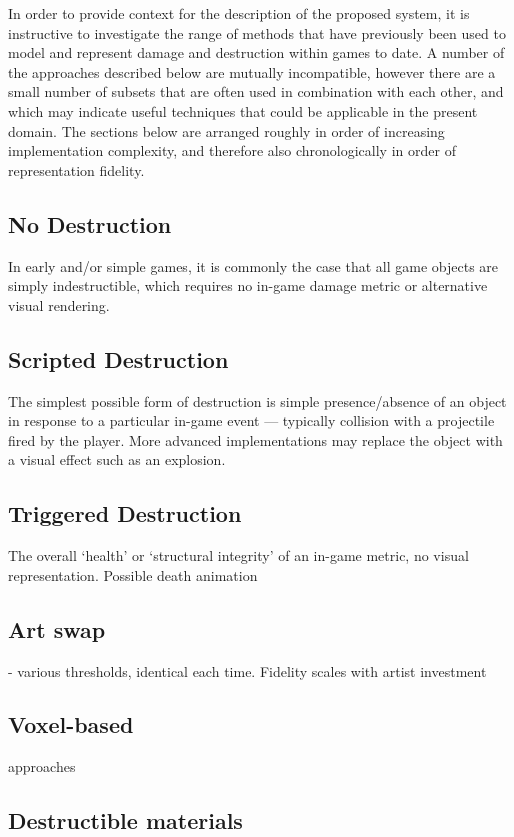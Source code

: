 \documentclass[11pt]{report}
\begin{document}
		In order to provide context for the description of the proposed system, it is instructive to investigate the range of methods that have previously been used to model and represent damage and destruction within games to date. A number of the approaches described below are mutually incompatible, however there are a small number of subsets that are often used in combination with each other, and which may indicate useful techniques that could be applicable in the present domain. The sections below are arranged roughly in order of increasing implementation complexity, and therefore also chronologically in order of representation fidelity.

		\subsection{No Destruction}
			In early and/or simple games, it is commonly the case that all game objects are simply indestructible, which requires no in-game damage metric or alternative visual rendering.

		\subsection{Scripted Destruction}
			The simplest possible form of destruction is simple presence/absence of an object in response to a particular in-game event --- typically collision with a projectile fired by the player. More advanced implementations may replace the object with a visual effect such as an explosion.

		\subsection{Triggered Destruction}
			The overall `health' or `structural integrity' of an 
		in-game metric, no visual representation. Possible death animation

		\subsection{Art swap} - various thresholds, identical each time. Fidelity scales with artist investment
		\subsection{Voxel-based} approaches
		\subsection{Destructible materials}
\end{document}
